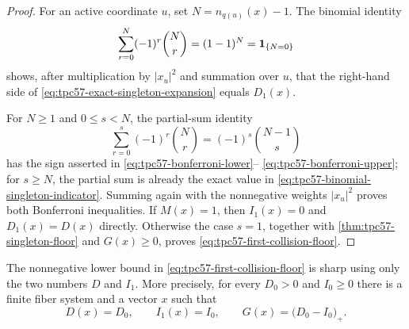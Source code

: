 \begin{proof}
For an active coordinate \(u\), set \(N=n_{q(u)}(x)-1\).  The binomial
identity
\begin{equation}
 \sum_{r=0}^{N}(-1)^r\binom Nr
 =(1-1)^N
 =\mathbf 1_{\{N=0\}}
 \label{eq:tpc57-binomial-singleton-indicator}
\end{equation}
shows, after multiplication by \(|x_u|^2\) and summation over \(u\), that
the right-hand side of \eqref{eq:tpc57-exact-singleton-expansion} equals
\(D_1(x)\).

For \(N\ge1\) and \(0\le s<N\), the partial-sum identity
\begin{equation}
 \sum_{r=0}^{s}(-1)^r\binom Nr
 =(-1)^s\binom{N-1}{s}
 \label{eq:tpc57-binomial-partial-sum}
\end{equation}
has the sign asserted in
\eqref{eq:tpc57-bonferroni-lower}--
\eqref{eq:tpc57-bonferroni-upper}; for \(s\ge N\), the partial sum is
already the exact value in
\eqref{eq:tpc57-binomial-singleton-indicator}.  Summing again with the
nonnegative weights \(|x_u|^2\) proves both Bonferroni inequalities.  If
\(M(x)=1\), then \(I_1(x)=0\) and \(D_1(x)=D(x)\) directly.  Otherwise the
case \(s=1\), together with
\cref{thm:tpc57-singleton-floor} and \(G(x)\ge0\), proves
\eqref{eq:tpc57-first-collision-floor}.
\end{proof}

\begin{proposition}
\label{prop:tpc57-first-moment-sharpness}
The nonnegative lower bound in
\eqref{eq:tpc57-first-collision-floor} is sharp using only the two numbers
\(D\) and \(I_1\).  More precisely, for every \(D_0>0\) and \(I_0\ge0\)
there is a finite fiber system and a vector \(x\) such that
\begin{equation}
 D(x)=D_0,
 \qquad I_1(x)=I_0,
 \qquad G(x)=\bigl(D_0-I_0\bigr)_+.
 \label{eq:tpc57-first-moment-equality-example}
\end{equation}
\end{proposition}

